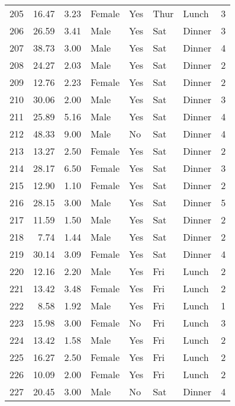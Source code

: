\begin{tabular}{lrrllllr}
205 &       16.47 &   3.23 &  Female &    Yes &  Thur &   Lunch &     3 \\
206 &       26.59 &   3.41 &    Male &    Yes &   Sat &  Dinner &     3 \\
207 &       38.73 &   3.00 &    Male &    Yes &   Sat &  Dinner &     4 \\
208 &       24.27 &   2.03 &    Male &    Yes &   Sat &  Dinner &     2 \\
209 &       12.76 &   2.23 &  Female &    Yes &   Sat &  Dinner &     2 \\
210 &       30.06 &   2.00 &    Male &    Yes &   Sat &  Dinner &     3 \\
211 &       25.89 &   5.16 &    Male &    Yes &   Sat &  Dinner &     4 \\
212 &       48.33 &   9.00 &    Male &     No &   Sat &  Dinner &     4 \\
213 &       13.27 &   2.50 &  Female &    Yes &   Sat &  Dinner &     2 \\
214 &       28.17 &   6.50 &  Female &    Yes &   Sat &  Dinner &     3 \\
215 &       12.90 &   1.10 &  Female &    Yes &   Sat &  Dinner &     2 \\
216 &       28.15 &   3.00 &    Male &    Yes &   Sat &  Dinner &     5 \\
217 &       11.59 &   1.50 &    Male &    Yes &   Sat &  Dinner &     2 \\
218 &        7.74 &   1.44 &    Male &    Yes &   Sat &  Dinner &     2 \\
219 &       30.14 &   3.09 &  Female &    Yes &   Sat &  Dinner &     4 \\
220 &       12.16 &   2.20 &    Male &    Yes &   Fri &   Lunch &     2 \\
221 &       13.42 &   3.48 &  Female &    Yes &   Fri &   Lunch &     2 \\
222 &        8.58 &   1.92 &    Male &    Yes &   Fri &   Lunch &     1 \\
223 &       15.98 &   3.00 &  Female &     No &   Fri &   Lunch &     3 \\
224 &       13.42 &   1.58 &    Male &    Yes &   Fri &   Lunch &     2 \\
225 &       16.27 &   2.50 &  Female &    Yes &   Fri &   Lunch &     2 \\
226 &       10.09 &   2.00 &  Female &    Yes &   Fri &   Lunch &     2 \\
227 &       20.45 &   3.00 &    Male &     No &   Sat &  Dinner &     4 \\

\end{tabular}
